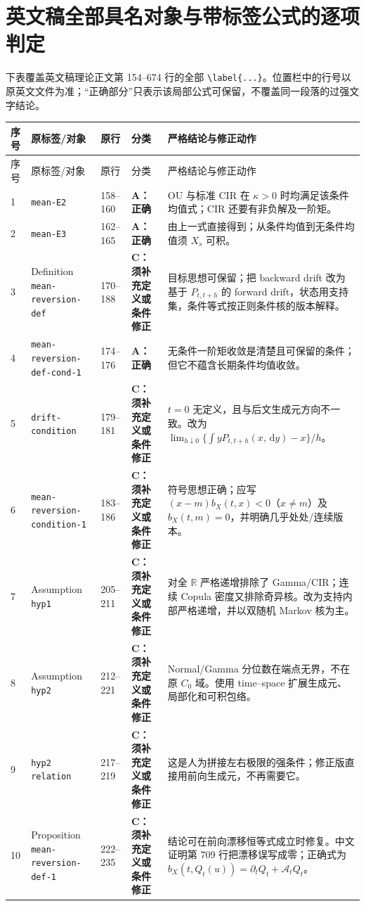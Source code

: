 \documentclass[UTF8,11pt]{ctexart}
\newcommand{\R}{\mathbb R}
\newcommand{\dd}{\,\mathrm d}
\newcommand{\Acat}{\textcolor{green!45!black}{\textbf{A：正确}}}
\newcommand{\Ccat}{\textcolor{orange!80!black}{\textbf{C：须补充定义或条件修正}}}
\begin{document}
\section{英文稿全部具名对象与带标签公式的逐项判定}

下表覆盖英文稿理论正文第 154--674 行的全部 \verb|\label{...}|。位置栏中的行号以原英文文件为准；“正确部分”只表示该局部公式可保留，不覆盖同一段落的过强文字结论。

\small
\begin{longtable}{p{}p{}p{}p{}p{}}
\toprule
序号 & 原标签/对象 & 原行 & 分类 & 严格结论与修正动作\\
\midrule
\endfirsthead
\toprule
序号 & 原标签/对象 & 原行 & 分类 & 严格结论与修正动作\\
\midrule
\endhead
1 & \texttt{mean-E2} & 158--160 & \Acat & OU 与标准 CIR 在 $\kappa>0$ 时均满足该条件均值式；CIR 还要有非负解及一阶矩。\\
2 & \texttt{mean-E3} & 162--165 & \Acat & 由上一式直接得到；从条件均值到无条件均值须 $X_s$ 可积。\\
3 & Definition \texttt{mean-reversion-def} & 170--188 & \Ccat & 目标思想可保留；把 backward drift 改为基于 $P_{t,t+h}$ 的 forward drift，状态用支持集，条件等式按正则条件核的版本解释。\\
4 & \texttt{mean-reversion-\allowbreak def-cond-1} & 174--176 & \Acat & 无条件一阶矩收敛是清楚且可保留的条件；但它不蕴含长期条件均值收敛。\\
5 & \texttt{drift-condition} & 179--181 & \Ccat & $t=0$ 无定义，且与后文生成元方向不一致。改为 $\lim_{h\downarrow0}\{\int yP_{t,t+h}(x,\dd y)-x\}/h$。\\
6 & \texttt{mean-reversion-\allowbreak condition-1} & 183--186 & \Ccat & 符号思想正确；应写 $(x-m)b_X(t,x)<0$（$x\ne m$）及 $b_X(t,m)=0$，并明确几乎处处/连续版本。\\
7 & Assumption \texttt{hyp1} & 205--211 & \Ccat & 对全 $\R$ 严格递增排除了 Gamma/CIR；连续 Copula 密度又排除奇异核。改为支持内部严格递增，并以双随机 Markov 核为主。\\
8 & Assumption \texttt{hyp2} & 212--221 & \Ccat & Normal/Gamma 分位数在端点无界，不在原 $C_0$ 域。使用 time--space 扩展生成元、局部化和可积包络。\\
9 & \texttt{hyp2 relation} & 217--219 & \Ccat & 这是人为拼接左右极限的强条件；修正版直接用前向生成元，不再需要它。\\
10 & Proposition \texttt{mean-reversion-\allowbreak def-1} & 222--235 & \Ccat & 结论可在前向漂移恒等式成立时修复。中文证明第 709 行把漂移误写成零；正确式为 $b_X(t,Q_t(u))=\partial_tQ_t+\mathcal A_tQ_t$。\\

\end{longtable}
\end{document}
